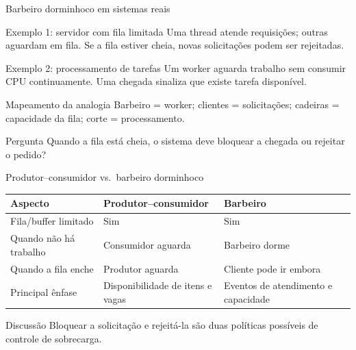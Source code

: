 \documentclass[aspectratio=169,11pt]{beamer}
\begin{document}
\begin{frame}{Barbeiro dorminhoco em sistemas reais}
\small
\begin{block}{Exemplo 1: servidor com fila limitada}
Uma thread atende requisições; outras aguardam em fila. Se a fila estiver cheia, novas solicitações podem ser rejeitadas.
\end{block}
\begin{block}{Exemplo 2: processamento de tarefas}
Um worker aguarda trabalho sem consumir CPU continuamente. Uma chegada sinaliza que existe tarefa disponível.
\end{block}
\begin{block}{Mapeamento da analogia}
Barbeiro = worker; clientes = solicitações; cadeiras = capacidade da fila; corte = processamento.
\end{block}
\begin{alertblock}{Pergunta}
Quando a fila está cheia, o sistema deve bloquear a chegada ou rejeitar o pedido?
\end{alertblock}
\end{frame}

\begin{frame}{Produtor--consumidor vs.\ barbeiro dorminhoco}
\small
\begin{tabular}{p{3.25cm}p{3cm}p{3cm}}
\toprule
\textbf{Aspecto} & \textbf{Produtor--consumidor} & \textbf{Barbeiro}\\
\midrule
Fila/buffer limitado & Sim & Sim\\
Quando não há trabalho & Consumidor aguarda & Barbeiro dorme\\
Quando a fila enche & Produtor aguarda & Cliente pode ir embora\\
Principal ênfase & Disponibilidade de itens e vagas & Eventos de atendimento e capacidade\\
\bottomrule
\end{tabular}
\vspace{0.3cm}
\begin{block}{Discussão}
Bloquear a solicitação e rejeitá-la são duas políticas possíveis de controle de sobrecarga.
\end{block}
\end{frame}
\end{document}
